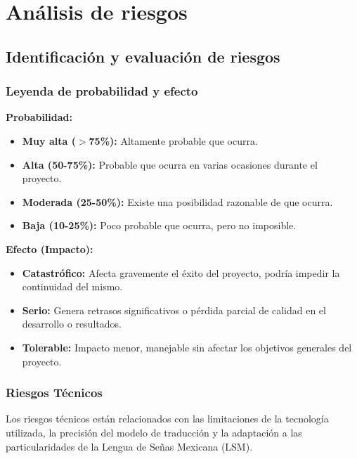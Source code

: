 \chapter{Análisis de riesgos}
\section{Identificación y evaluación de riesgos}
\subsection{Leyenda de probabilidad y efecto}

\textbf{Probabilidad:}
\begin{itemize}
	\item \textbf{Muy alta ($>$75\%):} Altamente probable que ocurra.
	\item \textbf{Alta (50-75\%):} Probable que ocurra en varias ocasiones durante el proyecto.
	\item \textbf{Moderada (25-50\%):} Existe una posibilidad razonable de que ocurra.
	\item \textbf{Baja (10-25\%):} Poco probable que ocurra, pero no imposible.
\end{itemize}

\textbf{Efecto (Impacto):}
\begin{itemize}
	\item \textbf{Catastrófico:} Afecta gravemente el éxito del proyecto, podría impedir la continuidad del mismo.
	\item \textbf{Serio:} Genera retrasos significativos o pérdida parcial de calidad en el desarrollo o resultados.
	\item \textbf{Tolerable:} Impacto menor, manejable sin afectar los objetivos generales del proyecto.
\end{itemize}

\subsection{Riesgos Técnicos}
Los riesgos técnicos están relacionados con las limitaciones de la tecnología utilizada, la precisión del modelo de traducción y la adaptación a las particularidades de la Lengua de Señas Mexicana (LSM).

